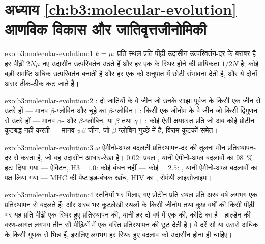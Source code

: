 \section*{अध्याय \ref{ch:b3:molecular-evolution} --- आणविक विकास और जातिवृत्तजीनोमिकी}

\begin{solution}{exo:b3:molecular-evolution:1}
$k = \mu$: प्रति स्थल प्रति पीढ़ी उदासीन  उत्परिवर्तन-दर
के बराबर है। हर पीढ़ी $2N\mu$ नए उदासीन उत्परिवर्तन उठते हैं और हर एक
के स्थिर होने की प्रायिकता $1/2N$ है; कोई बड़ी समष्टि अधिक उत्परिवर्तन
बनाती है और हर एक को अनुपात में छोटी संभावना देती है, और ये दोनों असर
ठीक-ठीक कट जाते हैं।
\end{solution}

\begin{solution}{exo:b3:molecular-evolution:2}
: दो जातियों के वे जीन जो उनके साझा पूर्वज के किसी एक जीन से
उतरे हों --- मानव $\beta$-ग्लोबिन और चूहे का $\beta$-ग्लोबिन।
: किसी एक जीनोम के वे जीन जो किसी द्विगुणन से उतरे हों ---
मानव $\alpha$- और $\beta$-ग्लोबिन, या $\beta$ तथा $\gamma$। :
कोई ऐसी क्षयग्रस्त प्रति जो अब कोई प्रोटीन कूटबद्ध नहीं करती --- मानव
$\psi\beta$ जीन, जो $\beta$-ग्लोबिन गुच्छे में है, विराम-कूटकों समेत।
\end{solution}

\begin{solution}{exo:b3:molecular-evolution:3}
$\omega$ ऐमीनो-अम्ल बदलती प्रतिस्थापन-दर की तुलना मौन प्रतिस्थापन-दर से
करता है, जो वह उदासीन आधार-रेखा है। $0.02$: प्रबल , यानी
ऐमीनो-अम्ल बदलावों का \qty{98}{\%} हटा दिया गया --- ऐक्टिन, 
H3। $1.0$: कोई बंधन नहीं --- कोई । $2.5$: , यानी
ऐमीनो-अम्ल बदलावों का पक्ष लिया गया --- MHC की पेप्टाइड-बंधक खाँच,
HIV का , रोमंथी लाइसोज़ाइम।
\end{solution}

\begin{solution}{exo:b3:molecular-evolution:4}
स्तनियों भर मिलाए गए प्रोटीन प्रति स्थल प्रति अरब वर्ष लगभग एक
प्रतिस्थापन से बदलते हैं; और अरब भर कूटलेखी स्थलों के किसी जीनोम तथा कुछ
वर्षों की किसी पीढ़ी भर यह प्रति पीढ़ी एक स्थिर हुए प्रतिस्थापन की, यानी
हर दो वर्ष में एक की, कोटि का है। हाल्डेन की वरण-लागत लगभग तीन सौ
पीढ़ियों में एक वरित प्रतिस्थापन की छूट देती है। वे दरें सौ या उससे
अधिक के किसी गुणक से भिन्न हैं, इसलिए लगभग हर स्थिर हुए बदलाव को उदासीन
होना ही चाहिए।
\end{solution}

